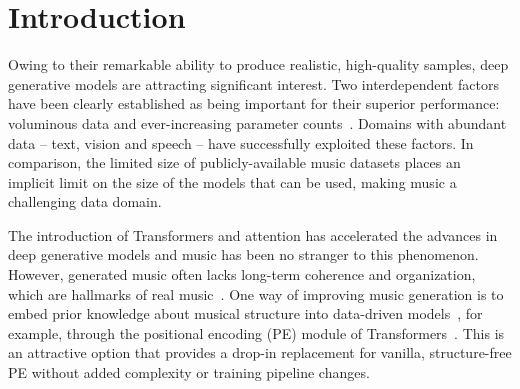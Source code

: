 \section{Introduction}
\label{sec:intro}




Owing to their remarkable ability to produce realistic, high-quality samples, deep generative models are attracting significant interest. Two interdependent factors have been clearly established as being important for their superior performance: voluminous data and ever-increasing parameter counts~\cite{kaplan_scaling_2020}. Domains with abundant data -- text, vision and speech -- have successfully exploited these factors. In comparison, the limited size of publicly-available music datasets places an implicit limit on the size of the models that can be used, making music a challenging data domain. 

The introduction of Transformers and attention has accelerated the advances in deep generative models and music has been no stranger to this phenomenon. However, generated music often lacks long-term coherence and organization, which are hallmarks of real music~\cite{wu_jazz_2020}.
One way of improving music generation is to embed prior knowledge about musical structure into data-driven models~\cite{ji_survey_2023,richard_model_2024,bhandari_motifs_2024}, for example, through the positional encoding (PE) module of Transformers~\cite{agarwal_structure_2024,yi_popmag_2020,guo_domain_2023,liu2022symphony}. 
This is an attractive option that provides a drop-in replacement for vanilla, structure-free PE without added complexity or training pipeline changes.


